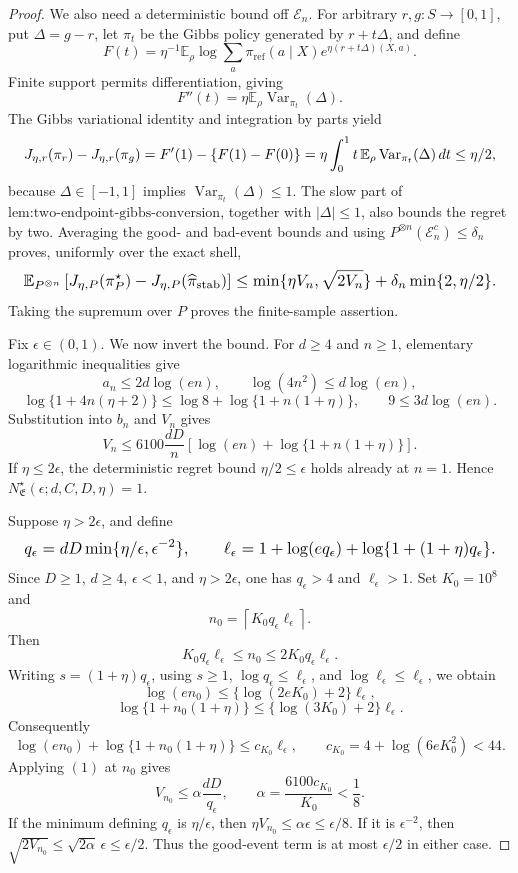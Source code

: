 \documentclass{article}
\begin{document}
\begin{proof}
We also need a deterministic bound off \(\mathcal E_n\). For arbitrary \(r,g:S\to[0,1]\), put \(\Delta=g-r\), let \(\pi_t\) be the Gibbs policy generated by \(r+t\Delta\), and define
\[
F(t)=\eta^{-1}\mathbb E_\rho\log\sum_a\pi_{\mathrm{ref}}(a\mid X)e^{\eta(r+t\Delta)(X,a)}.
\]
Finite support permits differentiation, giving
\[
F''(t)=\eta\mathbb E_\rho\operatorname{Var}_{\pi_t}(\Delta).
\]
The Gibbs variational identity and integration by parts yield
\[
\makebox[\linewidth][c]{\resizebox{0.98\linewidth}{!}{\(\displaystyle J_{\eta,r}(\pi_r)-J_{\eta,r}(\pi_g)
=F'(1)-\{F(1)-F(0)\}
=\eta\int_0^1t\,\mathbb E_\rho\operatorname{Var}_{\pi_t}(\Delta)\,dt
\le\eta/2,\)}}
\]
because \(\Delta\in[-1,1]\) implies \(\operatorname{Var}_{\pi_t}(\Delta)\le1\). The slow part of \(\text{lem:two-endpoint-gibbs-conversion}\), together with \(|\Delta|\le1\), also bounds the regret by two. Averaging the good- and bad-event bounds and using \(P^{\otimes n}(\mathcal E_n^c)\le\delta_n\) proves, uniformly over the exact shell,
\[
\makebox[\linewidth][c]{\resizebox{0.98\linewidth}{!}{\(\displaystyle \mathbb E_{P^{\otimes n}}\left[J_{\eta,P}(\pi_P^\star)-J_{\eta,P}(\widehat\pi_{\mathrm{stab}})\right]
\le\min\{\eta V_n,\sqrt{2V_n}\}
+\delta_n\min\{2,\eta/2\}.\)}}
\]
Taking the supremum over \(P\) proves the finite-sample assertion.

Fix \(\epsilon\in(0,1)\). We now invert the bound. For \(d\ge4\) and \(n\ge1\), elementary logarithmic inequalities give
\[
a_n\le2d\log(en),
\qquad
\log(4n^2)\le d\log(en),
\]
\[
\log\{1+4n(\eta+2)\}
\le\log8+\log\{1+n(1+\eta)\},
\qquad
9\le3d\log(en).
\]
Substitution into \(b_n\) and \(V_n\) gives
\[
V_n
\le6100\frac{dD}{n}
\left[\log(en)+\log\{1+n(1+\eta)\}\right].
\tag{1}
\]
If \(\eta\le2\epsilon\), the deterministic regret bound \(\eta/2\le\epsilon\) holds already at \(n=1\). Hence \(N^\star_{\mathfrak E}(\epsilon;d,C,D,\eta)=1\).

Suppose \(\eta>2\epsilon\), and define
\[
\makebox[\linewidth][c]{\resizebox{0.98\linewidth}{!}{\(\displaystyle q_\epsilon=dD\min\{\eta/\epsilon,\epsilon^{-2}\},
\qquad
\ell_\epsilon=1+\log(eq_\epsilon)+\log\{1+(1+\eta)q_\epsilon\}.\)}}
\]
Since \(D\ge1\), \(d\ge4\), \(\epsilon<1\), and \(\eta>2\epsilon\), one has \(q_\epsilon>4\) and \(\ell_\epsilon>1\). Set \(K_0=10^8\) and
\[
n_0=\left\lceil K_0q_\epsilon\ell_\epsilon\right\rceil.
\]
Then
\[
K_0q_\epsilon\ell_\epsilon\le n_0\le2K_0q_\epsilon\ell_\epsilon.
\]
Writing \(s=(1+\eta)q_\epsilon\), using \(s\ge1\), \(\log q_\epsilon\le\ell_\epsilon\), and \(\log\ell_\epsilon\le\ell_\epsilon\), we obtain
\[
\log(en_0)\le\{\log(2eK_0)+2\}\ell_\epsilon,
\]
\[
\log\{1+n_0(1+\eta)\}
\le\{\log(3K_0)+2\}\ell_\epsilon.
\]
Consequently
\[
\log(en_0)+\log\{1+n_0(1+\eta)\}
\le c_{K_0}\ell_\epsilon,
\qquad
c_{K_0}=4+\log(6eK_0^2)<44.
\]
Applying \((1)\) at \(n_0\) gives
\[
V_{n_0}\le\alpha\frac{dD}{q_\epsilon},
\qquad
\alpha=\frac{6100c_{K_0}}{K_0}<\frac18.
\]
If the minimum defining \(q_\epsilon\) is \(\eta/\epsilon\), then \(\eta V_{n_0}\le\alpha\epsilon\le\epsilon/8\). If it is \(\epsilon^{-2}\), then \(\sqrt{2V_{n_0}}\le\sqrt{2\alpha}\,\epsilon\le\epsilon/2\). Thus the good-event term is at most \(\epsilon/2\) in either case.


\end{proof}
\end{document}

